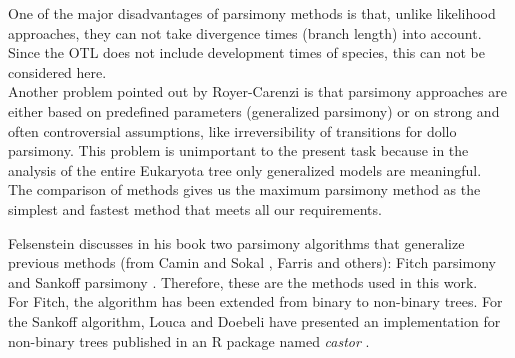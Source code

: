   One of the major disadvantages of parsimony methods is that, unlike likelihood approaches, they 
    can not take divergence times (branch length) into account. Since the OTL does not include 
    development times of species, this can not be considered here. \\
  Another problem pointed out by Royer-Carenzi is that parsimony approaches are either based on 
    predefined parameters (generalized parsimony) or on strong and often controversial assumptions, 
    like irreversibility of transitions for dollo parsimony. This problem is unimportant to the 
    present task because in the analysis of the entire Eukaryota tree only generalized models are 
    meaningful. \\
  The comparison of methods gives us the maximum parsimony method as the simplest and fastest method 
    that meets all our requirements.

  Felsenstein \cite{Felsenstein2003} discusses in his book two parsimony algorithms that generalize 
    previous methods (from Camin and Sokal \cite{Camin1965}, Farris \cite{Farris1970} and others): 
    Fitch parsimony \cite{Fitch1971} and Sankoff parsimony \cite{Sankoff1975}. Therefore, these are 
    the methods used in this work. \\
   For Fitch, the algorithm has been extended from binary to non-binary trees. For the Sankoff 
    algorithm, Louca and Doebeli have presented an implementation for non-binary trees published in 
    an R package named \textit{castor} \cite{Louca2017}.

